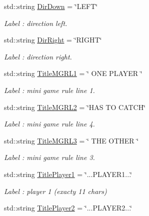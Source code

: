 \begin{DoxyCompactItemize}
std\-::string \hyperlink{struct_chase_game_1_1_s_lang_strings_acdb25c93c1bfd59df237ea8a9d3c1dff}{Dir\-Down} = \char`\"{}L\-E\-F\-T\char`\"{}
\begin{DoxyCompactList}\small\item\em Label \-: direction left. \end{DoxyCompactList}\item 
std\-::string \hyperlink{struct_chase_game_1_1_s_lang_strings_a72eca1e0efc7ab4c6900c4f75322f0dc}{Dir\-Right} = \char`\"{}R\-I\-G\-H\-T\char`\"{}
\begin{DoxyCompactList}\small\item\em Label \-: direction right. \end{DoxyCompactList}\item 
std\-::string \hyperlink{struct_chase_game_1_1_s_lang_strings_abdd2628446dc68073ab903fa6516747c}{Title\-M\-G\-R\-L1} = \char`\"{} O\-N\-E P\-L\-A\-Y\-E\-R \char`\"{}
\begin{DoxyCompactList}\small\item\em Label \-: mini game rule line 1. \end{DoxyCompactList}\item 
std\-::string \hyperlink{struct_chase_game_1_1_s_lang_strings_a0067f97060a17ea45752765221a80a7b}{Title\-M\-G\-R\-L2} = \char`\"{}H\-A\-S T\-O C\-A\-T\-C\-H\char`\"{}
\begin{DoxyCompactList}\small\item\em Label \-: mini game rule line 4. \end{DoxyCompactList}\item 
std\-::string \hyperlink{struct_chase_game_1_1_s_lang_strings_af09837dc3975dc46a32092fa63824a09}{Title\-M\-G\-R\-L3} = \char`\"{} T\-H\-E O\-T\-H\-E\-R \char`\"{}
\begin{DoxyCompactList}\small\item\em Label \-: mini game rule line 3. \end{DoxyCompactList}\item 
std\-::string \hyperlink{struct_chase_game_1_1_s_lang_strings_a95282707ee9c1c83bcb44ef4a167ba67}{Title\-Player1} = \char`\"{}...P\-L\-A\-Y\-E\-R1...\char`\"{}
\begin{DoxyCompactList}\small\item\em Label \-: player 1 (exacty 11 chars) \end{DoxyCompactList}\item 
std\-::string \hyperlink{struct_chase_game_1_1_s_lang_strings_a462589a11d9d088d7efdf6572c810c08}{Title\-Player2} = \char`\"{}...P\-L\-A\-Y\-E\-R2...\char`\"{}

\end{DoxyCompactItemize}
